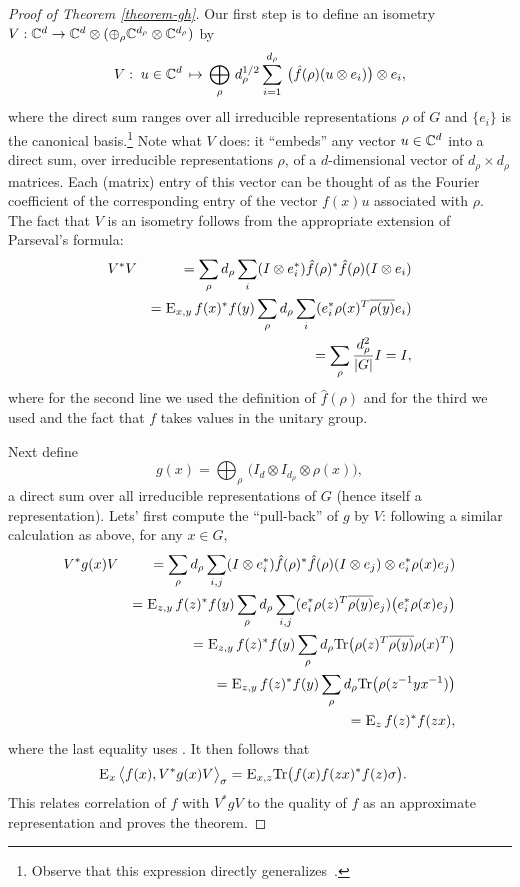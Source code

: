 \begin{proof}[Proof of Theorem \ref{theorem-gh}]
Our first step is to define an isometry $V:\mathbb{C}^d \to \mathbb{C}^d \otimes (\oplus_\rho \mathbb{C}^{d_\rho} \otimes \mathbb{C}^{d_\rho})$ by
$$ V :\;u \in \mathbb{C}^d \,\mapsto\, \bigoplus_\rho \,d_\rho^{1/2} \sum_{i=1}^{d_\rho} \,\big(\hat{f}(\rho) (u\otimes e_i)\big) \otimes e_i,$$
where the direct sum ranges over all irreducible representations $\rho$ of $G$ and $\{e_i\}$ is the canonical basis.\footnote{Observe that this expression directly generalizes~.}
Note what $V$ does: it ``embeds'' any vector $u\in \mathbb{C}^d$ into a direct sum, over irreducible representations $\rho$, of a $d$-dimensional vector of $d_\rho\times d_\rho$ matrices. Each (matrix) entry of this vector can be thought of as the Fourier coefficient of the corresponding entry of the vector $f(x)u$ associated with $\rho$. 
The fact that $V$ is an isometry follows from the appropriate extension of Parseval's formula:  
\begin{eqnarray*}
& V^* V &= \sum_\rho d_\rho \sum_i (I\otimes e_i^*) \hat{f}(\rho)^*\hat{f}(\rho) (I\otimes e_i)\\
&&= \textsc{E}_{x,y}\,  f(x)^*f(y) \sum_\rho d_\rho \sum_i  (e_i^* \rho(x)^T \overline{\rho(y)} e_i)\\
&&= \sum_\rho \frac{d_\rho^2}{|G|}I = I,
\end{eqnarray*}
where for the second line we used the definition  of $\hat{f}(\rho)$ and  for the third we used  and the fact that $f$ takes values in the unitary group.

Next define
$$g(x) = \bigoplus_\rho \,\big(I_d \otimes I_{d_\rho} \otimes \rho(x)\big), $$
a direct sum over all irreducible representations of $G$ (hence itself a representation). Lets' first compute the ``pull-back'' of $g$ by $V$: following a similar calculation as above, for any $x\in G$, 
\begin{eqnarray*}
& V^*g(x) V  &=  \sum_{\rho}  d_\rho \sum_{i,j} (I\otimes e_i^*)\hat{f}(\rho)^* \hat{f}(\rho)(I\otimes e_j) \otimes e_i^* \rho(x) e_j ) \\
&& =  \textsc{E}_{z,y}\,  f(z)^*f(y)  \sum_{\rho}  d_\rho \sum_{i,j} (e_i^* \rho(z)^T \overline{\rho(y)} e_j) \big( e_i^* \rho(x) e_j \big) \\
&& =  \textsc{E}_{z,y}\,  f(z)^*f(y)  \sum_{\rho}  d_\rho \mathrm{Tr}\big( \rho(z)^T \overline{\rho(y)}  {\rho(x)^T} \big) \\
&& =  \textsc{E}_{z,y}\,  f(z)^*f(y)  \sum_{\rho}  d_\rho \mathrm{Tr}\big( \rho(z^{-1}y x^{-1}) \big) \\
&& =  \textsc{E}_{z}\,  f(z)^*f(zx) , 
\end{eqnarray*}
where the last equality uses .
It then follows that 
\begin{eqnarray*}
\textsc{E}_{x}\, \big\langle f(x), V^*g(x) V \big\rangle_\sigma &=  \textsc{E}_{x,z} \mathrm{Tr}\big( f(x) f(zx)^* f(z)\sigma\big).
\end{eqnarray*}  
This relates correlation of $f$ with $V^*gV$ to the quality of $f$ as an approximate representation and proves the theorem. 
\end{proof}


